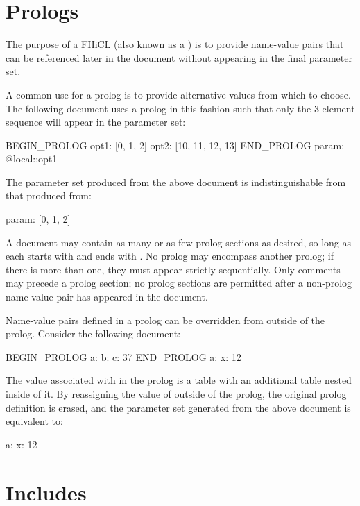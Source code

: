 \documentclass[draftmode,draftwater]{memarticle}
\newcommand{\fhicl}{FHiCL\xspace}
\begin{document}
\chapter{Prologs}
\label{sec:prologs}

The purpose of a \fhicl {} (also known as a ) is to provide name-value pairs that can be referenced
later in the document without appearing in the final parameter set.

A common use for a prolog is to provide alternative values from which
to choose.  The following document uses a prolog in this fashion such
that only the 3-element sequence will appear in the parameter set:
%
\Needspace{0.84in}
\begin{fcllisting}[texcl,escapechar=`]
BEGIN_PROLOG
  opt1: [0, 1, 2]
  opt2: [10, 11, 12, 13]
END_PROLOG
param: @local::opt1
\end{fcllisting}
%
The parameter set produced from the above document is
indistinguishable from that produced from:
%
\Needspace{0.17in}
\begin{fcllisting}[texcl,escapechar=`]
param: [0, 1, 2]
\end{fcllisting}

A document may contain as many or as few prolog sections as desired,
so long as each starts with  and ends with
.  No prolog may encompass another prolog; if
there is more than one, they must appear strictly sequentially.  Only
comments may precede a prolog section; no prolog sections are
permitted after a non-prolog name-value pair has appeared in the
document.

Name-value pairs defined in a prolog can be overridden from outside of
the prolog.  Consider the following document:
\Needspace{0.34in}
\begin{fcllisting}[texcl,escapechar=`]
BEGIN_PROLOG
a: { b: { c: 37 } }
END_PROLOG
a: { x: 12 }
\end{fcllisting}
%
The value associated with  in the prolog is a table with an
additional table nested inside of it.  By reassigning the value of
 outside of the prolog, the original prolog definition is
erased, and the parameter set generated from the above document is
equivalent to:
%
\Needspace{0.34in}
\begin{fcllisting}[texcl,escapechar=`]
a: { x: 12 }
\end{fcllisting}

\chapter{Includes}
\end{document}

